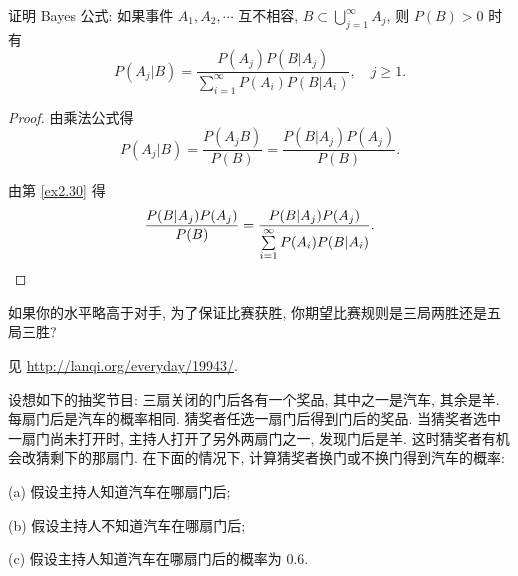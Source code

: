 \documentclass[color=black,device=normal,lang=cn]{elegantnote}
\numberwithin{equation}{section}
\theoremstyle{plain}
\numberwithin{exercise}{exsection}
\begin{document}
\begin{exercise}%
    证明 Bayes 公式: 如果事件 $A_1,A_2,\cdots$ 互不相容, $B\subset\bigcup\limits_{j=1}^\infty A_j$, 则 $P(B)>0$ 时有
    \[P(A_j|B)=\dfrac{P(A_j)P(B|A_j)}{\sum\limits_{i=1}^\infty P(A_i)P(B|A_i)},\quad j\geq1.\]
\end{exercise}
\begin{proof}
    由乘法公式得
    \[P(A_j|B)=\dfrac{P(A_jB)}{P(B)}=\dfrac{P(B|A_j)P(A_j)}{P(B)}.\]

    由第 \ref{ex2.30} 得
    \[\dfrac{P(B|A_j)P(A_j)}{P(B)}=\dfrac{P(B|A_j)P(A_j)}{\sum\limits_{i=1}^\infty P(A_i)P(B|A_i)}.\qedhere\]
\end{proof}
\begin{exercise}%
    如果你的水平略高于对手, 为了保证比赛获胜, 你期望比赛规则是三局两胜还是五局三胜?
\end{exercise}
\begin{solution}
    见 \url{http://lanqi.org/everyday/19943/}.
\end{solution}
\begin{exercise}%
    设想如下的抽奖节目: 三扇关闭的门后各有一个奖品, 其中之一是汽车, 其余是羊. 每扇门后是汽车的概率相同. 猜奖者任选一扇门后得到门后的奖品. 当猜奖者选中一扇门尚未打开时, 主持人打开了另外两扇门之一, 发现门后是羊. 这时猜奖者有机会改猜剩下的那扇门. 在下面的情况下, 计算猜奖者换门或不换门得到汽车的概率:

    (a) 假设主持人知道汽车在哪扇门后;

    (b) 假设主持人不知道汽车在哪扇门后;

    (c) 假设主持人知道汽车在哪扇门后的概率为 $0.6$.
\end{exercise}
\end{document}
